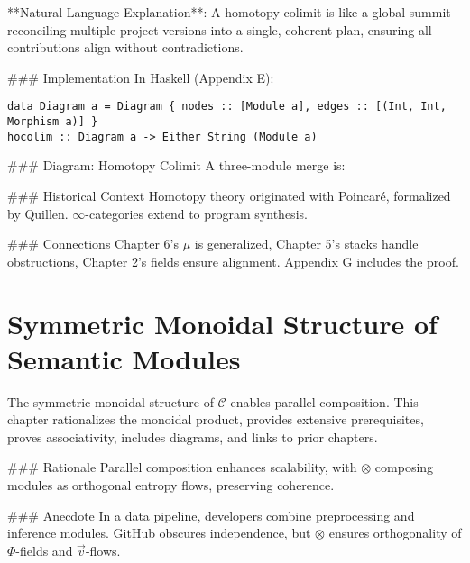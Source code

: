 \documentclass[12pt]{article}
\begin{document}
{**Natural Language Explanation**: A homotopy colimit is like a global summit reconciling multiple project versions into a single, coherent plan, ensuring all contributions align without contradictions.

### Implementation
In Haskell (Appendix E):

\begin{lstlisting}
data Diagram a = Diagram { nodes :: [Module a], edges :: [(Int, Int, Morphism a)] }
hocolim :: Diagram a -> Either String (Module a)
\end{lstlisting}

### Diagram: Homotopy Colimit
A three-module merge is:

\begin{center}
\end{center}

### Historical Context
Homotopy theory originated with Poincaré, formalized by Quillen. $\infty$-categories extend to program synthesis.

### Connections
Chapter 6’s $\mu$ is generalized, Chapter 5’s stacks handle obstructions, Chapter 2’s fields ensure alignment. Appendix G includes the proof.

\section{Symmetric Monoidal Structure of Semantic Modules}
\label{sec:chapter8}

The symmetric monoidal structure of $\mathcal{C}$ enables parallel composition. This chapter rationalizes the monoidal product, provides extensive prerequisites, proves associativity, includes diagrams, and links to prior chapters.

### Rationale
Parallel composition enhances scalability, with $\otimes$ composing modules as orthogonal entropy flows, preserving coherence.

### Anecdote
In a data pipeline, developers combine preprocessing and inference modules. GitHub obscures independence, but $\otimes$ ensures orthogonality of $\Phi$-fields and $\vec{v}$-flows.

}
\end{document}
